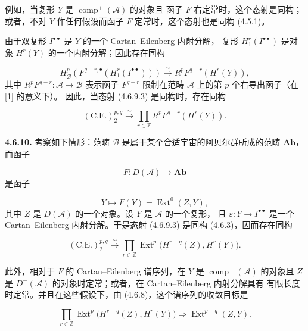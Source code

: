 \clearpage
{}%
\begingroup\small\setlength{\parskip}{0pt}\setlength{\emergencystretch}{1.5em}
\setlength{\abovedisplayskip}{4pt plus 2pt minus 2pt}%
\setlength{\belowdisplayskip}{4pt plus 2pt minus 2pt}%

\noindent 例如，当复形 $Y$ 是 $\operatorname{comp}^{+}(\mathcal A)$ 的对象且
函子 $F$ 右定常时，这个态射是同构；或者，不对 $Y$ 作任何假设而函子 $F$
定常时，这个态射也是同构 (4.5.1)。

由于双复形 $I^{\bullet\bullet}$ 是 $Y$ 的一个 Cartan--Eilenberg 内射分解，
复形 $H_1^r(I^{\bullet\bullet})$ 是对象 $H^r(Y)$ 的一个内射分解；因此存在同构

\[
H_{\mathcal B}^{p}\left(
F^{q-r,\bullet}(H_1^r(I^{\bullet\bullet}))
\right)
\xrightarrow{\sim}
R^pF^{q-r}(H^r(Y)),
\tag{4.6.9.4}
\]
其中 $R^pF^{q-r}\colon\mathcal A\longrightarrow\mathcal B$ 表示函子
$F^{q-r}$ 限制在范畴 $\mathcal A$ 上的第 $p$ 个右导出函子（在 [1] 的意义下）。
因此，当态射 (4.6.9.3) 是同构时，存在同构

\[
(\mathrm{C.E.})_2^{p,q}\xrightarrow{\sim}
\prod_{r\in\mathbb Z}R^pF^{q-r}(H^r(Y)).
\tag{4.6.9.5}
\]

\medskip\noindent\textbf{4.6.10.}\quad
考察如下情形：范畴 $\mathcal B$ 是属于某个合适宇宙的阿贝尔群所成的范畴
$\mathbf{Ab}$，而函子

\[
F\colon D(\mathcal A)\longrightarrow\mathbf{Ab}
\]
是函子

\[
Y\longmapsto F(Y)=\operatorname{Ext}^{0}(Z,Y),
\]
其中 $Z$ 是 $D(\mathcal A)$ 的一个对象。设 $Y$ 是 $\mathcal A$ 的一个复形，
且 $\varepsilon\colon Y\longrightarrow I^{\bullet\bullet}$ 是一个
Cartan--Eilenberg 内射分解。于是态射 (4.6.9.3) 是同构 (4.6.3)，因而存在同构

\[
(\mathrm{C.E.})_2^{p,q}\xrightarrow{\sim}
\prod_{r\in\mathbb Z}
\operatorname{Ext}^{p}\bigl(H^{r-q}(Z),H^r(Y)\bigr).
\tag{4.6.10.1}
\]

此外，相对于 $F$ 的 Cartan--Eilenberg 谱序列，在 $Y$ 是
$\operatorname{comp}^{+}(\mathcal A)$ 的对象且 $Z$ 是
$D^{-}(\mathcal A)$ 的对象时定常；或者，在 Cartan--Eilenberg 内射分解具有
有限长度时定常。并且在这些假设下，由 (4.6.8)，这个谱序列的收敛目标是

\[
\prod_{r\in\mathbb Z}
\operatorname{Ext}^{p}\bigl(H^{r-q}(Z),H^r(Y)\bigr)
\Longrightarrow
\operatorname{Ext}^{p+q}(Z,Y).
\]
\endgroup
